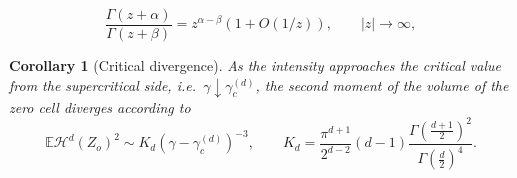 \documentclass[10pt,a4paper]{amsart}
\newtheorem{corollary}{Corollary}
\def\EE{\mathbb{E}}
\def\cH{\mathcal{H}}
\begin{document}
    \begin{equation}\label{eq:gamma_ratio}
    \frac{\Gamma(z+\alpha)}{\Gamma(z+\beta)}
	=
	z^{\alpha-\beta}(1+O(1/z)),
	\qquad |z|\to\infty,
    \end{equation}

\begin{corollary}[Critical divergence]\label{cor:GammaToCritical_d}
	As the intensity approaches the critical value from the supercritical side, i.e.\ $\gamma \downarrow \gamma_c^{(d)}$, the second moment of the volume of the zero cell diverges according to
	\[
	\EE\cH^d(Z_o)^2 \sim K_d \left( \gamma - \gamma_c^{(d)} \right)^{-3},\qquad K_d = \frac{\pi^{d+1}}{2^{d-2}} (d-1) \frac{\Gamma\left(\frac{d+1}{2}\right)^2}{\Gamma\left(\frac{d}{2}\right)^4}.
	\]
\end{corollary}
\end{document}
